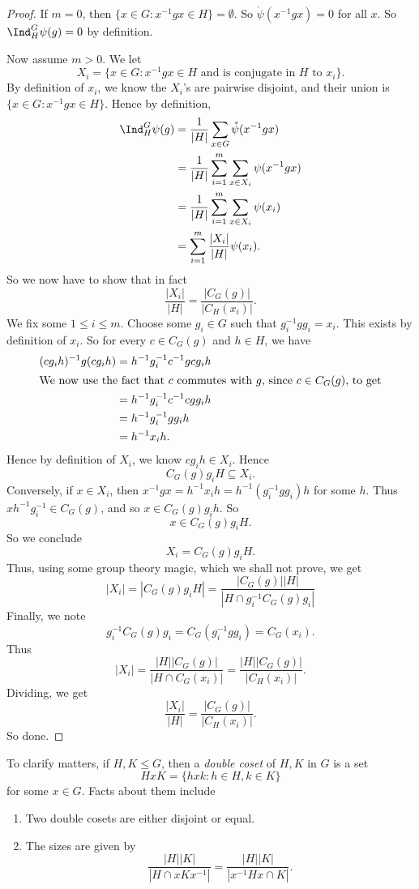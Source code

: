 \documentclass[a4paper]{article}
\begin{document}
\begin{proof}
  If $m = 0$, then $\{x \in G: x^{-1}gx \in H\} = \emptyset$. So $\mathring{\psi}(x^{-1}gx) = 0$ for all $x$. So $\Ind_H^G \psi(g) = 0$ by definition.

  Now assume $m > 0$. We let
  \[
    X_i = \{x \in G: x^{-1}gx \in H\text{ and is conjugate in $H$ to $x_i$}\}.
  \]
  By definition of $x_i$, we know the $X_i$'s are pairwise disjoint, and their union is $\{x \in G: x^{-1}gx \in H\}$. Hence by definition,
  \begin{align*}
    \Ind_H^G \psi(g) &= \frac{1}{|H|} \sum_{x \in G} \mathring{\psi}(x^{-1}gx) \\
    &= \frac{1}{|H|}\sum_{i = 1}^m \sum_{x \in X_i} \psi(x^{-1}gx)\\
    &= \frac{1}{|H|}\sum_{i = 1}^m \sum_{x \in X_i} \psi(x_i)\\
    &= \sum_{i = 1}^m \frac{|X_i|}{|H|} \psi(x_i).
  \end{align*}
  So we now have to show that in fact
  \[
    \frac{|X_i|}{|H|} = \frac{|C_G(g)|}{|C_H(x_i)|}.
  \]
  We fix some $1 \leq i \leq m$. Choose some $g_i \in G$ such that $g_i^{-1} gg_i = x_i$. This exists by definition of $x_i$. So for every $c \in C_G(g)$ and $h \in H$, we have
  \begin{align*}
    (cg_i h)^{-1} g(cg_i h) &= h^{-1} g_i^{-1} c^{-1}gcg_i h \\
    \intertext{We now use the fact that $c$ commutes with $g$, since $c \in C_G (g)$, to get}
    &= h^{-1}g_i^{-1} c^{-1}cg g_ih \\
    &= h^{-1} g_i^{-1}gg_i h \\
    &= h^{-1} x_i h.
  \end{align*}
  Hence by definition of $X_i$, we know $cg_i h \in X_i$. Hence
  \[
    C_G(g) g_i H \subseteq X_i.
  \]
  Conversely, if $x \in X_i$, then $x^{-1}gx = h^{-1} x_i h = h^{-1}(g_i^{-1}g g_i) h$ for some $h$. Thus $xh^{-1}g_i^{-1} \in C_G(g)$, and so $x \in C_G(g) g_i h$. So
  \[
    x \in C_G(g) g_i H.
  \]
  So we conclude
  \[
    X_i = C_G(g) g_i H.
  \]
  Thus, using some group theory magic, which we shall not prove, we get
  \[
    |X_i| = |C_G(g) g_iH| = \frac{|C_G(g)||H|}{|H \cap g_i^{-1}C_G(g)g_i|}
  \]
  Finally, we note
  \[
    g_i^{-1}C_G(g) g_i = C_G(g_i^{-1} gg_i) = C_G(x_i).
  \]
  Thus
  \[
    |X_i| = \frac{|H||C_G(g)|}{|H\cap C_G(x_i)|} = \frac{|H||C_G(g)|}{|C_H(x_i)|}.
  \]
  Dividing, we get
  \[
    \frac{|X_i|}{|H|} = \frac{|C_G(g)|}{|C_H(x_i)|}.
  \]
  So done.
\end{proof}
To clarify matters, if $H, K \leq G$, then a \emph{double coset} of $H, K$ in $G$ is a set
\[
  HxK = \{hxk: h \in H, k \in K\}
\]
for some $x \in G$. Facts about them include
\begin{enumerate}
  \item Two double cosets are either disjoint or equal.
  \item The sizes are given by
    \[
      \frac{|H||K|}{|H\cap xKx^{-1}|} = \frac{|H||K|}{|x^{-1}Hx \cap K|}.
    \]
\end{enumerate}
\end{document}
